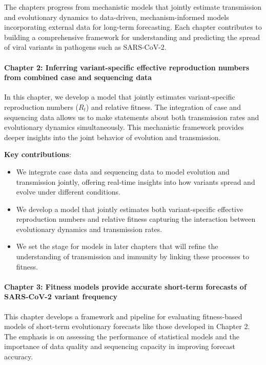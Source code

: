 The chapters progress from mechanistic models that jointly estimate transmission and evolutionary dynamics to data-driven, mechanism-informed models incorporating external data for long-term forecasting.
Each chapter contributes to building a comprehensive framework for understanding and predicting the spread of viral variants in pathogens such as SARS-CoV-2.

\paragraph{Chapter 2: Inferring variant-specific effective reproduction numbers from combined case and sequencing data}

In this chapter, we develop a model that jointly estimates variant-specific reproduction numbers ($R_t$) and relative fitness.
The integration of case and sequencing data allows us to make statements about both transmission rates and evolutionary dynamics simultaneously.
This mechanistic framework provides deeper insights into the joint behavior of evolution and transmission.

\noindent\textbf{Key contributions}:
\begin{itemize}
  \item We integrate case data and sequencing data to model evolution and transmission jointly, offering real-time insights into how variants spread and evolve under different conditions.
  \item We develop a model that jointly estimates both variant-specific effective reproduction numbers and relative fitness capturing the interaction between evolutionary dynamics and transmission rates.
  \item We set the stage for models in later chapters that will refine the understanding of transmission and immunity by linking these processes to fitness.
\end{itemize}

\paragraph{Chapter 3: Fitness models provide accurate short-term forecasts of SARS-CoV-2 variant frequency}

This chapter develops a framework and pipeline for evaluating fitness-based models of short-term evolutionary forecasts like those developed in Chapter 2.
The emphasis is on assessing the performance of statistical models and the importance of data quality and sequencing capacity in improving forecast accuracy.

